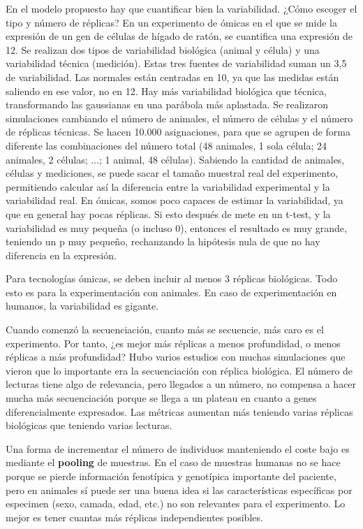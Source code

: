 En el modelo propuesto hay que cuantificar bien la variabilidad. ¿Cómo escoger el tipo y número de réplicas? En un experimento de ómicas en el que se mide la expresión de un gen de células de hígado de ratón, se cuantifica una expresión de 12. Se realizan dos tipos de variabilidad biológica (animal y célula) y una variabilidad técnica (medición). Estas tres fuentes de variabilidad suman un 3,5 de variabilidad. Las normales están centradas en 10, ya que las medidas están saliendo en ese valor, no en 12. Hay más variabilidad biológica que técnica, transformando las gaussianas en una parábola más aplastada. Se realizaron simulaciones cambiando el número de animales, el número de células y el número de réplicas técnicas. Se hacen 10.000 asignaciones, para que se agrupen de forma diferente las combinaciones del número total (48 animales, 1 sola célula; 24 animales, 2 células; ...; 1 animal, 48 células). Sabiendo la cantidad de animales, células y mediciones, se puede sacar el tamaño muestral real del experimento, permitiendo calcular así la diferencia entre la variabilidad experimental y la variabilidad real. En ómicas, somos poco capaces de estimar la variabilidad, ya que en general hay pocas réplicas. Si esto después de mete en un t-test, y la variabilidad es muy pequeña (o incluso 0), entonces el resultado es muy grande, teniendo un p muy pequeño, rechanzando la hipótesis nula de que no hay diferencia en la expresión.

Para tecnologías ómicas, se deben incluir al menos 3 réplicas biológicas. Todo esto es para la experimentación con animales. En caso de experimentación en humanos, la variabilidad es gigante. 

Cuando comenzó la secuenciación, cuanto más se secuencie, más caro es el experimento. Por tanto, ¿es mejor más réplicas a menos profundidad, o menos réplicas a más profundidad? Hubo varios estudios con muchas simulaciones que vieron que lo importante era la secuenciación con réplica biológica. El número de lecturas tiene algo de relevancia, pero llegados a un número, no compensa a hacer mucha más secuenciación porque se llega a un plateau en cuanto a genes diferencialmente expresados. Las métricas aumentan más teniendo varias réplicas biológicas que teniendo varias lecturas. 

Una forma de incrementar el número de individuos manteniendo el coste bajo es mediante el \textbf{pooling} de muestras. En el caso de muestras humanas no se hace porque se pierde información fenotípica y genotípica importante del paciente, pero en animales sí puede ser una buena idea si las características específicas por especimen (sexo, camada, edad, etc.) no son relevantes para el experimento. Lo mejor es tener cuantas más réplicas independientes posibles. 

